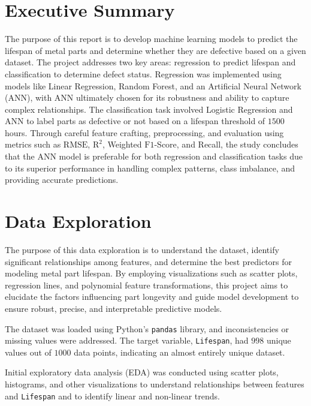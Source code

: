 \documentclass{article}
\begin{document}
\begin{cwauthorlist}
\end{cwauthorlist}

\section{Executive Summary}

The purpose of this report is to develop machine learning models to predict the lifespan of metal parts and determine whether they are defective based on a given dataset. The project addresses two key areas: regression to predict lifespan and classification to determine defect status. Regression was implemented using models like Linear Regression, Random Forest, and an Artificial Neural Network (ANN), with ANN ultimately chosen for its robustness and ability to capture complex relationships. The classification task involved Logistic Regression and ANN to label parts as defective or not based on a lifespan threshold of $1500$ hours. Through careful feature crafting, preprocessing, and evaluation using metrics such as $\text{RMSE}$, $\text{R}^2$, Weighted $\text{F1}$-Score, and Recall, the study concludes that the ANN model is preferable for both regression and classification tasks due to its superior performance in handling complex patterns, class imbalance, and providing accurate predictions.

\section{Data Exploration}

The purpose of this data exploration is to understand the dataset, identify significant relationships among features, and determine the best predictors for modeling metal part lifespan. By employing visualizations such as scatter plots, regression lines, and polynomial feature transformations, this project aims to elucidate the factors influencing part longevity and guide model development to ensure robust, precise, and interpretable predictive models.

The dataset was loaded using Python's \texttt{pandas} library, and inconsistencies or missing values were addressed. The target variable, \texttt{Lifespan}, had $998$ unique values out of $1000$ data points, indicating an almost entirely unique dataset.

Initial exploratory data analysis (EDA) was conducted using scatter plots, histograms, and other visualizations to understand relationships between features and \texttt{Lifespan} and to identify linear and non-linear trends.
\end{document}
